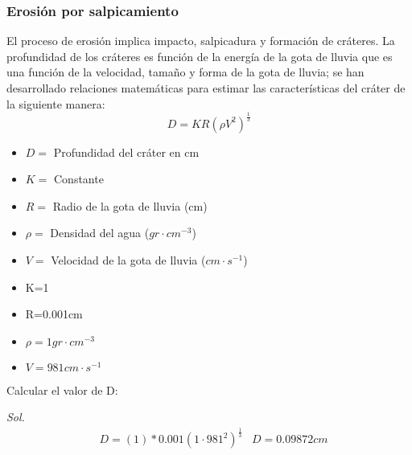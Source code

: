     \subsubsection{Erosión por salpicamiento}
    El proceso de erosión implica impacto, salpicadura y formación de cráteres. La profundidad de los cráteres es función de la energía de la gota de lluvia que es una función de la velocidad, tamaño y forma de la gota de lluvia; se han desarrollado relaciones matemáticas para estimar las características del cráter de la siguiente manera:
    \begin{equation}
        D = KR\left(\rho V^2\right)^{\frac{1}{3}}
    \end{equation}
    \begin{notation}
    \begin{itemize}
        \item $D=$ Profundidad del cráter en cm
        \item $K=$ Constante
        \item $R=$ Radio de la gota de lluvia (cm)
        \item $\rho=$ Densidad del agua ($gr\cdot cm^{-3}$)
        \item $V=$ Velocidad de la gota de lluvia ($cm\cdot s^{-1}$)
    \end{itemize}
    \end{notation}
    \begin{example}
        \begin{itemize}
            \item K=1
            \item R=0.001cm
            \item $\rho=1gr\cdot cm^{-3}$
            \item $V=981 cm\cdot s^{-1}$
        \end{itemize}
    Calcular el valor de D:
    
    \textit{ Sol. }
        \begin{align*}
            &D =(1)*0.001\left(1\cdot 981^2\right)^{\frac{1}{3}}
            &D = 0.09872cm
        \end{align*}
    \end{example}
    
